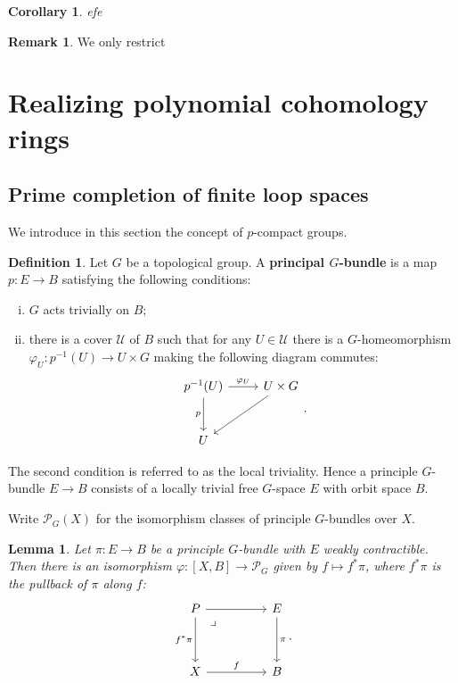 \documentclass[psamsfonts]{amsart}
\newtheorem{cor}{Corollary}[section]
\newtheorem{lem}{Lemma}[section]
\theoremstyle{definition}
\newtheorem{defn}{Definition}[section]
\newtheorem{rem}{Remark}[section]
\numberwithin{equation}{section}
\begin{document}
\begin{cor}
efe
\end{cor}

\begin{rem}
We only restrict
\end{rem}


\section{Realizing polynomial cohomology rings}

\subsection{Prime completion of finite loop spaces} We introduce in this section the concept of $p$-compact groups.

\begin{defn}
Let $G$ be a topological group. A \textbf{principal $G$-bundle} is a map $p:E\to B$ satisfying the following conditions:\begin{enumerate}[(i)]
    \item $G$ acts trivially on $B$;
    \item there is a cover $\mathcal{U}$ of $B$ such that for any $U\in\mathcal{U}$ there is a $G$-homeomorphism $\varphi_U:p^{-1}(U)\to U\times G$ making the following diagram commutes:
    \[\begin{tikzcd}[row sep=large]
p^{-1}(U)\arrow[d,"p"']\arrow[r,"\varphi_U"]&U\times G\arrow[dl]\\
U
\end{tikzcd}.\]
\end{enumerate}
The second condition is referred to as the local triviality. Hence a principle $G$-bundle $E\to B$ consists of a locally trivial free $G$-space $E$ with orbit space $B$.
\end{defn}

Write $\mathcal{P}_G(X)$ for the isomorphism classes of principle $G$-bundles over $X$.

\begin{lem}
Let $\pi:E\to B$ be a principle $G$-bundle with $E$ weakly contractible. Then there is an isomorphism $\varphi:[X,B]\to\mathcal{P}_G$ given by $f\mapsto f^\ast\pi$, where $f^\ast\pi$ is the pullback of $\pi$ along $f$:
\[\begin{tikzcd}[column sep=huge, row sep=huge]
P\arrow[r]\arrow[phantom,dr,"\lrcorner", very near start]\arrow[d,"f^\ast\pi"']&E\arrow[d,"\pi"]\\
X\arrow[r,"f"]&B
\end{tikzcd}.\]
\end{lem}
\end{document}
